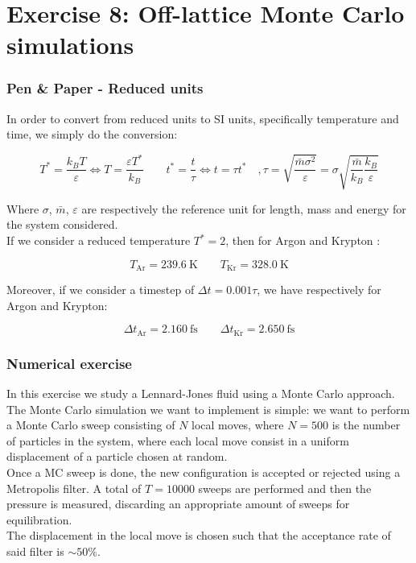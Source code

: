\chapter*{Exercise 8: Off-lattice Monte Carlo simulations}

\subsection*{Pen \& Paper - Reduced units}
In order to convert from reduced units to SI units, specifically temperature and time, we simply do the conversion:

$$ T^* = \frac{k_B T}{\varepsilon} \iff T = \frac{\varepsilon T^*}{k_B} \qquad t^* = \frac{t}{\tau} \iff t = \tau t^* \quad, \tau = \sqrt{\frac{\bar{m}\sigma^2}{\varepsilon}} = \sigma\sqrt{\frac{\bar{m}}{k_B} \frac{k_B}{\varepsilon}} $$

Where $\sigma$, $\bar{m}$, $\varepsilon$ are respectively the reference unit for length, mass and energy for the system considered. \\

If we consider a reduced temperature $ T^* = 2 $, then for Argon and Krypton : 

$$ T_{\text{Ar}} = 239.6\ \text{K} \qquad  T_{\text{Kr}} = 328.0\ \text{K} $$

Moreover, if we consider a timestep of $\Delta t = 0.001\tau$, we have respectively for Argon and Krypton:

$$ \Delta t_{\text{Ar}} = 2.160\ \text{fs} \qquad  \Delta t_{\text{Kr}} = 2.650\ \text{fs} $$

\subsection*{Numerical exercise}

In this exercise we study a Lennard-Jones fluid using a Monte Carlo approach. \\
The Monte Carlo simulation we want to implement is simple: we want to perform a Monte Carlo sweep consisting of $N$ local moves, where $N = 500$ is the number of particles in the system, where each local move consist in a uniform displacement of a particle chosen at random. \\
Once a MC sweep is done, the new configuration is accepted or rejected using a Metropolis filter.
A total of $ T = 10000 $ sweeps are performed and then the pressure is measured, discarding an appropriate amount of sweeps for equilibration. \\
The displacement in the local move is chosen such that the acceptance rate of said filter is $\sim 50 \%$. \\


